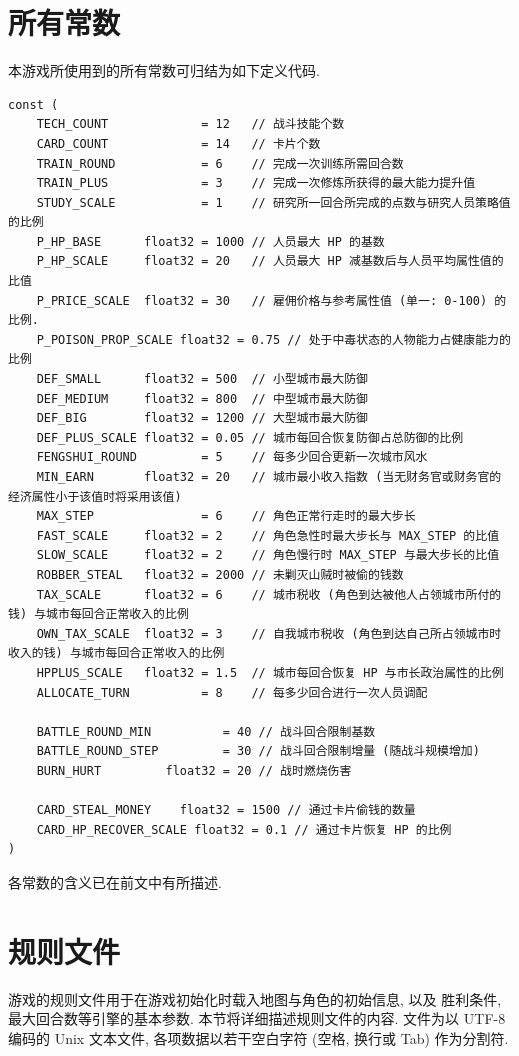 \documentclass[UTF8, zihao=-4]{ctexart} %
\begin{document}
\section{所有常数}
\label{s_const}
本游戏所使用到的所有常数可归结为如下定义代码.
\begin{lstlisting}
const (
	TECH_COUNT             = 12   // 战斗技能个数
	CARD_COUNT             = 14   // 卡片个数
	TRAIN_ROUND            = 6    // 完成一次训练所需回合数
    TRAIN_PLUS             = 3    // 完成一次修炼所获得的最大能力提升值
	STUDY_SCALE            = 1    // 研究所一回合所完成的点数与研究人员策略值的比例
	P_HP_BASE      float32 = 1000 // 人员最大 HP 的基数
	P_HP_SCALE     float32 = 20   // 人员最大 HP 减基数后与人员平均属性值的比值
	P_PRICE_SCALE  float32 = 30   // 雇佣价格与参考属性值 (单一: 0-100) 的比例.
	P_POISON_PROP_SCALE float32 = 0.75 // 处于中毒状态的人物能力占健康能力的比例
	DEF_SMALL	   float32 = 500  // 小型城市最大防御
	DEF_MEDIUM     float32 = 800  // 中型城市最大防御
	DEF_BIG  	   float32 = 1200 // 大型城市最大防御
	DEF_PLUS_SCALE float32 = 0.05 // 城市每回合恢复防御占总防御的比例
	FENGSHUI_ROUND         = 5    // 每多少回合更新一次城市风水
	MIN_EARN       float32 = 20   // 城市最小收入指数 (当无财务官或财务官的经济属性小于该值时将采用该值)
	MAX_STEP               = 6    // 角色正常行走时的最大步长
	FAST_SCALE     float32 = 2    // 角色急性时最大步长与 MAX_STEP 的比值
	SLOW_SCALE     float32 = 2    // 角色慢行时 MAX_STEP 与最大步长的比值
	ROBBER_STEAL   float32 = 2000 // 未剿灭山贼时被偷的钱数
	TAX_SCALE      float32 = 6    // 城市税收 (角色到达被他人占领城市所付的钱) 与城市每回合正常收入的比例
	OWN_TAX_SCALE  float32 = 3    // 自我城市税收 (角色到达自己所占领城市时收入的钱) 与城市每回合正常收入的比例
	HPPLUS_SCALE   float32 = 1.5  // 城市每回合恢复 HP 与市长政治属性的比例
	ALLOCATE_TURN          = 8    // 每多少回合进行一次人员调配

	BATTLE_ROUND_MIN          = 40 // 战斗回合限制基数
	BATTLE_ROUND_STEP         = 30 // 战斗回合限制增量 (随战斗规模增加)
	BURN_HURT         float32 = 20 // 战时燃烧伤害

	CARD_STEAL_MONEY    float32 = 1500 // 通过卡片偷钱的数量
	CARD_HP_RECOVER_SCALE float32 = 0.1 // 通过卡片恢复 HP 的比例
)
\end{lstlisting}
各常数的含义已在前文中有所描述.

\section{规则文件}
\label{s_mfile}
游戏的规则文件用于在游戏初始化时载入地图与角色的初始信息, 以及
胜利条件, 最大回合数等引擎的基本参数. 本节将详细描述规则文件的内容. 
文件为以 UTF-8 编码的 Unix 文本文件, 各项数据以若干空白字符 (空格, 换行或 Tab)
作为分割符.
\end{document}
